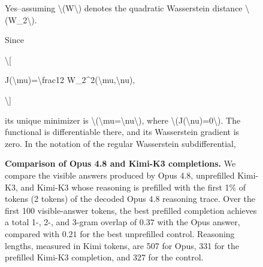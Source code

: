 \begin{figure}[t]
\begin{answercol}[equal height group=ansX3]
  \raggedright Yes--assuming \textbackslash{}(W\textbackslash{}) denotes the quadratic Wasserstein distance \textbackslash{}(W\_2\textbackslash{}).\par\vspace{2pt}
  Since\par\vspace{2pt}
  \textbackslash{}[\par\vspace{2pt}
  J(\textbackslash{}mu)=\textbackslash{}frac12 W\_2\textasciicircum{}2(\textbackslash{}mu,\textbackslash{}nu),\par\vspace{2pt}
  \textbackslash{}]\par\vspace{2pt}
  its unique minimizer is \textbackslash{}(\textbackslash{}mu=\textbackslash{}nu\textbackslash{}), where \textbackslash{}(J(\textbackslash{}nu)=0\textbackslash{}). The functional is differentiable there, and its Wasserstein gradient is zero. In the notation of the regular Wasserstein subdifferential,\par\vspace{3pt}\elide
\end{answercol}
\caption{\textbf{Comparison of Opus 4.8 and Kimi-K3 completions.} We compare
the visible answers produced by Opus 4.8, unprefilled Kimi-K3, and Kimi-K3
whose reasoning is prefilled with the first 1\% of tokens (2 tokens) of the decoded Opus 4.8 reasoning trace. Over the first 100 visible-answer tokens, the best
prefilled completion achieves a total 1-, 2-, and 3-gram overlap of $0.37$
with the Opus answer, compared with $0.21$ for the best unprefilled
control. Reasoning lengths, measured in Kimi tokens, are 507 for Opus,
331 for the prefilled Kimi-K3 completion, and 327 for the control.}
\label{fig:exhibit_X3}
\end{figure}


